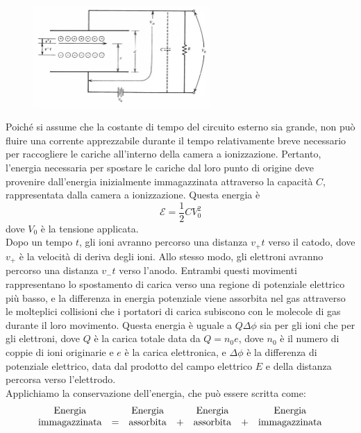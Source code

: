 \begin{approfondimento}
\begin{figure}[H]
      \centering
      \includegraphics[width=0.6\textwidth]{immagini/circuito_forma_segnale.png}
   \end{figure}
   Poiché si assume che la costante di tempo del circuito esterno sia grande, non può fluire una corrente apprezzabile durante il tempo relativamente breve necessario per raccogliere le cariche all'interno della camera a ionizzazione. Pertanto, l'energia necessaria per spostare le cariche dal loro punto di origine deve provenire dall'energia inizialmente immagazzinata attraverso la capacità $C$, rappresentata dalla camera a ionizzazione. Questa energia è
   \begin{equation*}
      \mathcal{E}=\frac{1}{2}CV_0^2
   \end{equation*}
   dove $V_0$ è la tensione applicata.\\
   Dopo un tempo $t$, gli ioni avranno percorso una distanza $v_{+}t$ verso il catodo, dove $v_{+} $ è la velocità di deriva degli ioni. Allo stesso modo, gli elettroni avranno percorso una distanza $v_{-}t$ verso l'anodo. Entrambi questi movimenti rappresentano lo spostamento di carica verso una regione di potenziale elettrico più basso, e la differenza in energia potenziale viene assorbita nel gas attraverso le molteplici collisioni che i portatori di carica subiscono con le molecole di gas durante il loro movimento. Questa energia è uguale a $Q \Delta\phi$ sia per gli ioni che per gli elettroni, dove $Q$ è la carica totale data da $Q=n_0e$, dove $n_0$ è il numero di coppie di ioni originarie e $e$ è la carica elettronica, e $\Delta\phi$ è la differenza di potenziale elettrico, data dal prodotto del campo elettrico $E$ e della distanza percorsa verso l'elettrodo.\\
   Applichiamo la conservazione dell'energia, che può essere scritta come:
   \begin{gather*}
      \begin{array}{ccccccc}
         \rm Energia &  & \rm Energia &  & \rm Energia & & \rm Energia\\
         \rm immagazzinata & = & \rm assorbita & + & \rm assorbita & + & \rm immagazzinata\\

\end{array}
\end{gather*}
\end{approfondimento}
